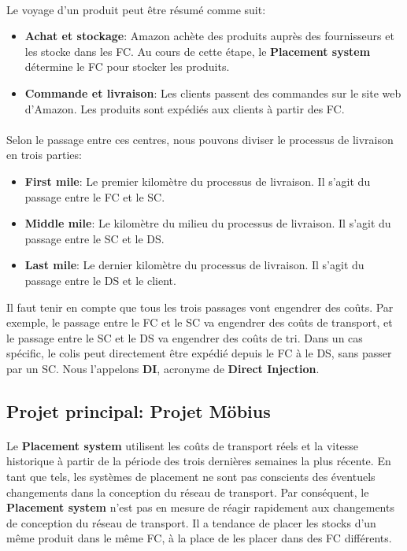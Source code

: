 \paragraph{}
\vspace{-2em}
Le voyage d'un produit peut être résumé comme suit:
\begin{itemize}
    \item \textbf{Achat et stockage}: Amazon achète des produits auprès des fournisseurs et les stocke dans les FC. Au cours de cette étape, le \textbf{Placement system} détermine le FC pour stocker les produits.
    \item \textbf{Commande et livraison}: Les clients passent des commandes sur le site web d'Amazon. Les produits sont expédiés aux clients à partir des FC.
\end{itemize}
\paragraph{}
\vspace{-2em}
Selon le passage entre ces centres, nous pouvons diviser le processus de livraison en trois parties:
\begin{itemize}
    \item \textbf{First mile}: Le premier kilomètre du processus de livraison. Il s'agit du passage entre le FC et le SC.
    \item \textbf{Middle mile}: Le kilomètre du milieu du processus de livraison. Il s'agit du passage entre le SC et le DS.
    \item \textbf{Last mile}: Le dernier kilomètre du processus de livraison. Il s'agit du passage entre le DS et le client.
\end{itemize}

Il faut tenir en compte que tous les trois passages vont engendrer des coûts. Par exemple, le passage entre le FC et le SC va engendrer des coûts de transport, et le passage entre le SC et le DS va engendrer des coûts de tri. Dans un cas spécific, le colis peut directement être expédié depuis le FC à le DS, sans passer par un SC. Nous l'appelons \textbf{DI}, acronyme de \textbf{Direct Injection}.

\subsection{Projet principal: Projet Möbius}
\paragraph{}
\vspace{-2em}
Le \textbf{Placement system} utilisent les coûts de transport réels et la vitesse historique à partir de la période des trois dernières semaines la plus récente. En tant que tels, les systèmes de placement ne sont pas conscients des éventuels changements dans la conception du réseau de transport. Par conséquent, le \textbf{Placement system} n'est pas en mesure de réagir rapidement aux changements de conception du réseau de transport. Il a tendance de placer les stocks d'un même produit dans le même FC, à la place de les placer dans des FC différents. 
